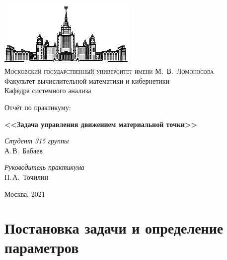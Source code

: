 \documentclass[11pt]{article}
\begin{document}
	
	\thispagestyle{empty}
	
	\begin{center}
		\ \vspace{-3cm}
		
		\includegraphics[width=0.5\textwidth]{msu.eps}\\
		{\scshape Московский государственный университет имени М.~В.~Ломоносова}\\
		Факультет вычислительной математики и кибернетики\\
		Кафедра системного анализа
		
		\vfill
		
		{\LARGE Отчёт по  практикуму:}
		
		\vspace{1cm}
		
		{\Huge\bfseries <<Задача управления движением материальной точки>>}
	\end{center}
	
	\vspace{1cm}
	
	\begin{flushright}
		\large
		\textit{Студент 315 группы}\\
		А.\,В.~Бабаев
		
		\vspace{5mm}
		
		\textit{Руководитель практикума}\\
		 П.\,А.~Точилин
	\end{flushright}
	
	\vfill
	
	\begin{center}
		Москва, 2021
	\end{center}
	
	\newpage
	\tableofcontents
	\newpage
	
	{\vspace*{-2cm} \hspace*{-1cm}\section{Постановка задачи и определение параметров}}
\end{document}
